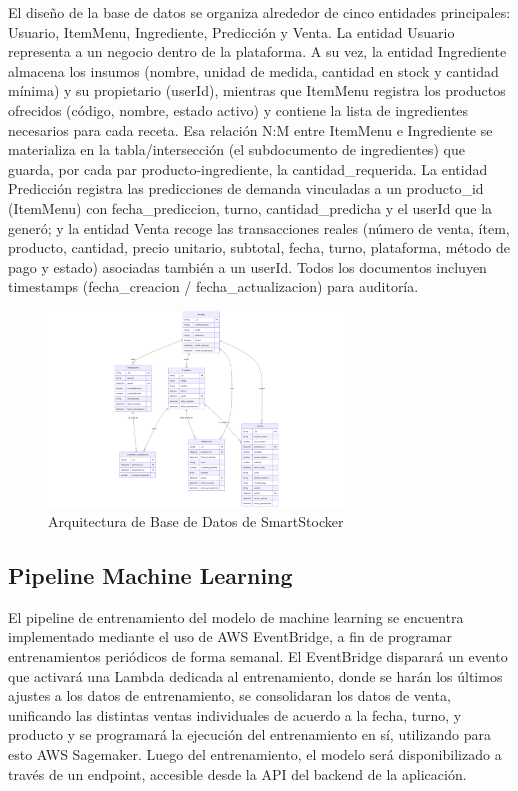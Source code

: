 El diseño de la base de datos se organiza alrededor de cinco entidades principales: Usuario, ItemMenu, Ingrediente, Predicción y Venta. La entidad Usuario representa a un negocio dentro de la plataforma. A su vez, la entidad Ingrediente almacena los insumos (nombre, unidad de medida, cantidad en stock y cantidad mínima) y su propietario (userId), mientras que ItemMenu registra los productos ofrecidos (código, nombre, estado activo) y contiene la lista de ingredientes necesarios para cada receta. Esa relación N:M entre ItemMenu e Ingrediente se materializa en la tabla/intersección (el subdocumento de ingredientes) que guarda, por cada par producto-ingrediente, la cantidad\_requerida. La entidad Predicción registra las predicciones de demanda vinculadas a un producto\_id (ItemMenu) con fecha\_prediccion, turno, cantidad\_predicha y el userId que la generó; y la entidad Venta recoge las transacciones reales (número de venta, ítem, producto, cantidad, precio unitario, subtotal, fecha, turno, plataforma, método de pago y estado) asociadas también a un userId. Todos los documentos incluyen timestamps (fecha\_creacion / fecha\_actualizacion) para auditoría.

\begin{figure}[htbp]
    \centering
    \includegraphics[width=0.7\textwidth]{images/arquitectura-base-datos.png}
    \caption{Arquitectura de Base de Datos de SmartStocker}
    \label{fig:arquitectura-base-datos}
\end{figure}

\subsection{Pipeline Machine Learning}\label{sec:pipeline-machine-learning}

El pipeline de entrenamiento del modelo de machine learning se encuentra implementado mediante el uso de AWS EventBridge, a fin de programar entrenamientos periódicos de forma semanal. El EventBridge disparará un evento que activará una Lambda dedicada al entrenamiento, donde se harán los últimos ajustes a los datos de entrenamiento, se consolidaran los datos de venta, unificando las distintas ventas individuales de acuerdo a la fecha, turno, y producto y se programará la ejecución del entrenamiento en sí, utilizando para esto AWS Sagemaker. Luego del entrenamiento, el modelo será disponibilizado a través de un endpoint, accesible desde la API del backend de la aplicación.

